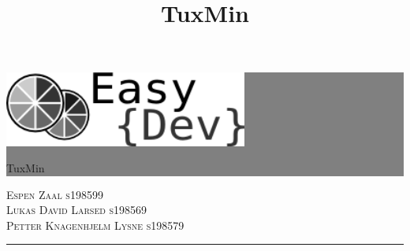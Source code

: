 \setlength{\oddsidemargin}{0mm} %
\setlength{\evensidemargin}{0mm} %

\newcommand{\HRule}[1]{\hfill \rule{0.2\linewidth}{#1}} %



\thispagestyle{empty} %


\colorbox{grey}{
	\parbox[t]{1.0\linewidth}{
		\centering \fontsize{50pt}{80pt}\selectfont %
		\vspace*{0.7cm} %
		
		\hfill 
		\includegraphics[width=80mm]{./img/fremside/logo.png} \\
		\hfill 
		\fontsize{30pt}{50pt}\selectfont 
		{\selectfont 
		TuxMin
		\title{TuxMin}
		}
		\par
		
		\vspace*{0.5cm} %
	}
}


\vfill %


{\centering \large 
\hfill \textsc{Espen Zaal s198599} \\
\hfill \textsc{Lukas David Larsed s198569} \\
\hfill \textsc{Petter Knagenhjelm Lysne s198579} \\



\HRule{1pt}} %


\clearpage %